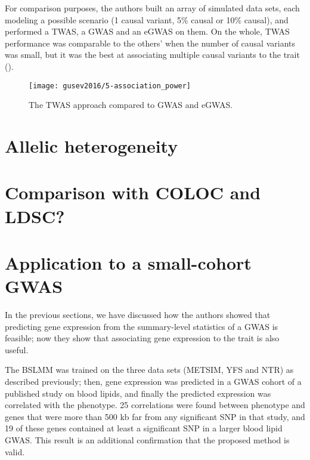 \documentclass[../main.tex]{subfiles}
\begin{document}
For comparison purposes, the authors built an array of simulated data 
sets, each modeling a possible scenario (1 causal variant, 5\% causal or 
10\% causal), and performed a TWAS, a GWAS and an eGWAS on them. On the 
whole, TWAS performance was comparable to the others' when the number of 
causal variants was small, but it was the best at associating multiple 
causal variants to the trait ().

\begin{figure}
	\texttt{[image: gusev2016/5-association\_power]}
	\caption{The TWAS approach compared to GWAS and eGWAS.}
\end{figure}

\section{Allelic heterogeneity}


\section{Comparison with COLOC and LDSC?}

\section{Application to a small-cohort GWAS}

In the previous sections, we have discussed how the authors showed that 
predicting gene expression from the summary-level statistics of a GWAS 
is feasible; now they show that associating gene expression to the trait 
is also useful.

The BSLMM was trained on the three data sets (METSIM, YFS and NTR) as 
described previously; then, gene expression was predicted in a GWAS 
cohort of a published study on blood lipids, and finally the predicted 
expression was correlated with the phenotype. 25 correlations were found 
between phenotype and genes that were more than 500 kb far from any 
significant SNP in that study, and 19 of these genes contained at least 
a significant SNP in a larger blood lipid GWAS. This result is an 
additional confirmation that the proposed method is valid.
\end{document}
